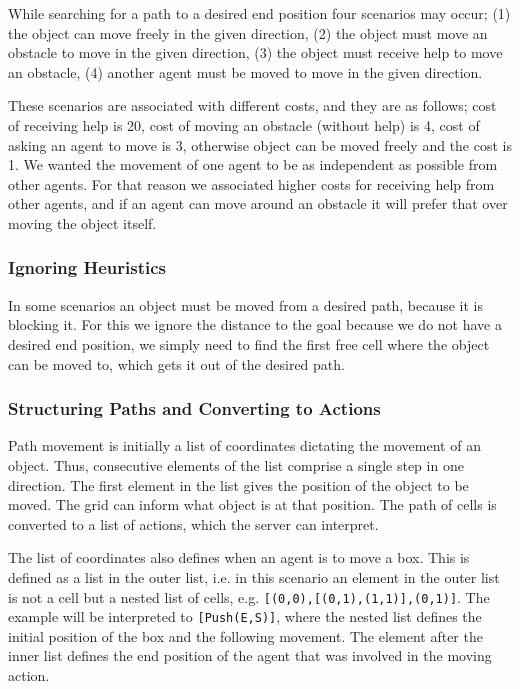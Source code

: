 While searching for a path to a desired end position four scenarios may occur; (1) the object can move freely in the given direction, (2) the object must move an obstacle to move in the given direction, (3) the object must receive help to move an obstacle, (4) another agent must be moved to move in the given direction.

These scenarios are associated with different costs, and they are as follows; cost of receiving help is 20, cost of moving an obstacle (without help) is 4, cost of asking an agent to move is 3, otherwise object can be moved freely and the cost is 1.
We wanted the movement of one agent to be as independent as possible from other agents.
For that reason we associated higher costs for receiving help from other agents, and if an agent can move around an obstacle it will prefer that over moving the object itself.

\subsubsection{Ignoring Heuristics}

In some scenarios an object must be moved from a desired path, because it is blocking it.
For this we ignore the distance to the goal because we do not have a desired end position, we simply need to find the first free cell where the object can be moved to, which gets it out of the desired path.

\subsubsection{Structuring Paths and Converting to Actions}

Path movement is initially a list of coordinates dictating the movement of an object.
Thus, consecutive elements of the list comprise a single step in one direction.
The first element in the list gives the position of the object to be moved.
The grid can inform what object is at that position.
The path of cells is converted to a list of actions, which the server can interpret.

The list of coordinates also defines when an agent is to move a box.
This is defined as a list in the outer list, i.e. in this scenario an element in the outer list is not a cell but a nested list of cells, e.g. \texttt{[(0,0),[(0,1),(1,1)],(0,1)]}.
The example will be interpreted to \texttt{[Push(E,S)]}, where the nested list defines the initial position of the box and the following movement.
The element after the inner list defines the end position of the agent that was involved in the moving action.
